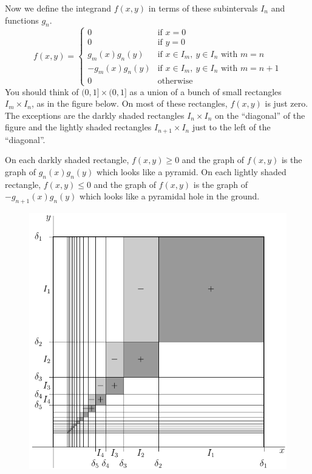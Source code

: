 \begin{eg}
Now we define the integrand $f(x,y)$ in terms of these subintervals $I_n$
and functions $g_n$.
\begin{equation*}
f(x,y)=\begin{cases}
   0& \text{if $x=0$}\\[0.05in]
   0& \text{if $y=0$}\\[0.05in]
   g_m(x)g_n(y)& \text{if $x\in I_m,\ y\in I_n$ with $m=n$}\\[0.05in]
   -g_m(x)g_n(y)& \text{if $x\in I_m,\ y\in I_n$ with $m=n+1$}\\[0.05in]
   0& \text{otherwise}
   \end{cases}
\end{equation*}
You should think of $(0,1]\times(0,1]$ as a union of a bunch of 
small rectangles $I_m\times I_n$, as in the figure below. On most 
of these rectangles, $f(x,y)$ is just zero. The exceptions are the 
darkly shaded rectangles $I_n\times I_n$ on the ``diagonal'' of the figure 
and the lightly shaded rectangles $I_{n+1}\times I_n$ just to the left 
of the ``diagonal''. 

On each darkly shaded rectangle, $f(x,y)\ge 0$ and the graph of $f(x,y)$ 
is the graph of $g_n(x)g_n(y)$ which looks like a pyramid. On each 
lightly shaded rectangle, $f(x,y)\le 0$ and the graph of $f(x,y)$ is 
the graph of $-g_{n+1}(x)g_n(y)$ which looks like a pyramidal hole 
in the ground. 
\begin{figure}[h]
\begin{efig}
\begin{center}
   \includegraphics[scale=0.8]{fubini.pdf}
\end{center}
\end{efig}
\end{figure}


\end{eg}
